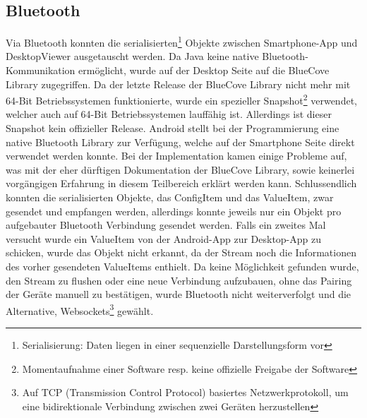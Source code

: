 \subsection{Bluetooth}
Via Bluetooth konnten die serialisierten\footnote{Serialisierung: Daten liegen in einer sequenzielle Darstellungsform vor} 
Objekte zwischen Smartphone-App und DesktopViewer ausgetauscht werden. 
Da Java keine native Bluetooth-Kommunikation ermöglicht, wurde auf der 
Desktop Seite auf die BlueCove Library \cite{Inf:Bluecove} zugegriffen. Da der letzte Release der 
BlueCove Library nicht mehr mit 64-Bit Betriebssystemen funktionierte, wurde ein spezieller 
Snapshot\footnote{Momentaufnahme einer Software resp. keine offizielle Freigabe der Software} 
verwendet, welcher auch auf 64-Bit Betriebssystemen lauffähig ist. Allerdings ist dieser Snapshot 
kein offizieller Release.
Android stellt bei der Programmierung eine native Bluetooth 
Library zur Verfügung, welche auf der Smartphone Seite direkt verwendet werden konnte. 
Bei der Implementation kamen einige Probleme auf, was mit der eher dürftigen 
Dokumentation der BlueCove Library, sowie keinerlei vorgängigen Erfahrung in diesem Teilbereich 
erklärt werden kann. Schlussendlich konnten die serialisierten Objekte, das ConfigItem 
und das ValueItem, zwar gesendet und empfangen werden, allerdings konnte jeweils nur ein Objekt pro aufgebauter 
Bluetooth Verbindung gesendet werden. Falls ein zweites Mal versucht wurde ein ValueItem von der 
Android-App zur Desktop-App zu schicken, wurde das Objekt nicht erkannt, da der 
Stream noch die Informationen des vorher gesendeten ValueItems enthielt. 
Da keine Möglichkeit gefunden wurde, den Stream zu flushen oder eine neue 
Verbindung aufzubauen, ohne das Pairing der Geräte manuell zu bestätigen, wurde Bluetooth 
nicht weiterverfolgt und die Alternative, Websockets\footnote{Auf TCP (Transmission Control Protocol) basiertes Netzwerkprotokoll, 
um eine bidirektionale Verbindung zwischen zwei Geräten herzustellen} gewählt. 

            
